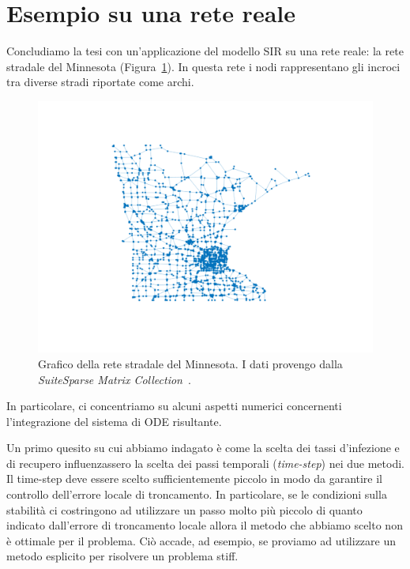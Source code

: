 \section{Esempio su una rete reale}
Concludiamo la tesi con un'applicazione del modello SIR su una rete reale:  la rete stradale del Minnesota (Figura~\ref{fig::minnesota}). In questa rete i nodi rappresentano gli incroci tra diverse stradi riportate come archi.
\begin{figure}[htb]
\centering
\includegraphics{Figure/minnesota}
\caption[Grafico della rete stradale del Minnesota.]{Grafico della rete stradale del Minnesota. I dati provengo dalla \emph{SuiteSparse Matrix Collection}~\cite{RepMatrici}.}\label{fig::minnesota}
\end{figure}
In particolare, ci concentriamo su alcuni aspetti numerici concernenti l'integrazione del sistema di ODE risultante.

Un primo quesito su cui abbiamo indagato \`e come la scelta dei tassi d'infezione e di recupero influenzassero la scelta dei passi temporali (\emph{time-step}) nei due metodi. Il time-step deve essere scelto sufficientemente piccolo in modo da garantire il controllo dell'errore locale di troncamento.  In particolare, se le condizioni sulla stabilit\`a ci costringono ad utilizzare un passo molto pi\`u piccolo di quanto indicato dall'errore di troncamento locale allora il metodo che abbiamo scelto non \`e ottimale per il problema. Ci\`o accade, ad esempio, se proviamo ad utilizzare un metodo esplicito per risolvere un problema stiff.
	
